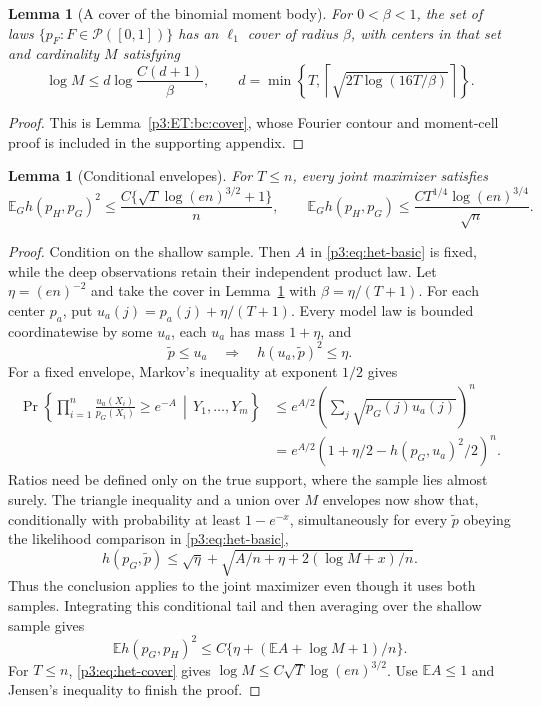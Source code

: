 \documentclass[11pt,a4paper]{article}
\newtheorem{lemma}[theorem]{Lemma}
\theoremstyle{definition}
\theoremstyle{remark}
\numberwithin{equation}{section}
\begin{document}
\begin{lemma}[A cover of the binomial moment body]\label{p3:lem:het-cover}
For $0<\beta<1$, the set of laws $\{p_F:F\in\mathcal P([0,1])\}$ has
an $\ell_1$ cover of radius $\beta$, with centers in that set and
cardinality $M$ satisfying
\begin{equation}\label{p3:eq:het-cover}
 \log M\le d\log\frac{C(d+1)}\beta,
 \qquad
 d=\min\left\{T,
        \left\lceil\sqrt{2T\log(16T/\beta)}\right\rceil\right\}.
\end{equation}
\end{lemma}
\begin{proof}
This is Lemma~\ref{p3:ET:bc:cover}, whose Fourier contour and moment-cell
proof is included in the supporting appendix.
\end{proof}

\begin{lemma}[Conditional envelopes]\label{p3:lem:het-hellinger}
For $T\le n$, every joint maximizer satisfies
\begin{equation}\label{p3:eq:het-hellinger}
 \mathbb E_Gh(p_H,p_G)^2
   \le\frac{C\{\sqrt T\log(en)^{3/2}+1\}}n,
 \qquad
 \mathbb E_Gh(p_H,p_G)
   \le\frac{CT^{1/4}\log(en)^{3/4}}{\sqrt n}.
\end{equation}
\end{lemma}
\begin{proof}
Condition on the shallow sample.  Then $A$ in
\eqref{p3:eq:het-basic} is fixed, while the deep observations retain their
independent product law.  Let $\eta=(en)^{-2}$ and take the cover in
Lemma~\ref{p3:lem:het-cover} with $\beta=\eta/(T+1)$.  For each center
$p_a$, put $u_a(j)=p_a(j)+\eta/(T+1)$.  Every model law is bounded
coordinatewise by some $u_a$, each $u_a$ has mass $1+\eta$, and
\[
 \widetilde p\le u_a\quad\Longrightarrow\quad
 h(u_a,\widetilde p)^2\le\eta.
\]
For a fixed envelope, Markov's inequality at exponent $1/2$ gives
\begin{align*}
 \Pr\left\{\prod_{i=1}^n\frac{u_a(X_i)}{p_G(X_i)}\ge e^{-A}
                  \,\middle|\,Y_1,\ldots,Y_m\right\}
 &\le e^{A/2}\left(\sum_j\sqrt{p_G(j)u_a(j)}\right)^n\\
 &=e^{A/2}\left(1+\eta/2-h(p_G,u_a)^2/2\right)^n.
\end{align*}
Ratios need be defined only on the true support, where the sample lies
almost surely.  The triangle inequality and a union over $M$ envelopes
now show that, conditionally with probability at least $1-e^{-x}$,
simultaneously for every $\widetilde p$ obeying the likelihood comparison
in \eqref{p3:eq:het-basic},
\[
 h(p_G,\widetilde p)
 \le\sqrt\eta+
        \sqrt{A/n+\eta+2(\log M+x)/n}.
\]
Thus the conclusion applies to the joint maximizer even though it uses
both samples.  Integrating this conditional tail and then averaging over
the shallow sample gives
\[
 \mathbb E h(p_G,p_H)^2
   \le C\{\eta+(\mathbb EA+\log M+1)/n\}.
\]
For $T\le n$, \eqref{p3:eq:het-cover} gives
$\log M\le C\sqrt T\log(en)^{3/2}$.  Use $\mathbb EA\le1$ and Jensen's
inequality to finish the proof.
\end{proof}
\end{document}
